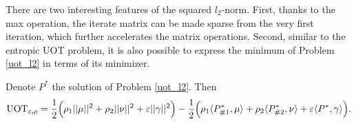 There are two interesting features of the squared $l_2$-norm. First, thanks to the max operation,
the iterate matrix can be made sparse from the very first iteration,
which further accelerates the matrix operations. Second, similar to the entropic UOT problem,
it is also possible to express the minimum of Problem \ref{uot_l2} in terms of its minimizer.
\begin{corollary}
Denote $P^*$ the solution of Problem \ref{uot_l2}. Then
\begin{align*}
  \text{UOT}_{\varepsilon, \rho} = \frac{1}{2} \Big( \rho_1 ||\mu||^2
  + \rho_2 ||\nu||^2 + \varepsilon ||\gamma||^2 \Big)
  - \frac{1}{2} \Big( \rho_1 \langle P^*_{\# 1}, \mu \rangle
  + \rho_2 \langle P^*_{\# 2}, \nu \rangle + \varepsilon \langle P^*, \gamma \rangle \Big).
\end{align*}
\end{corollary}
